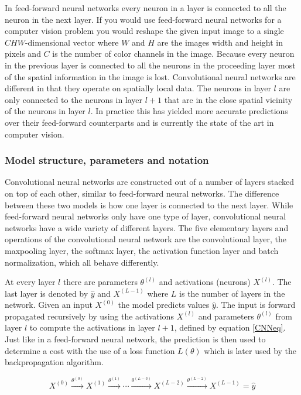 \documentclass[a4paper,11pt,twoside]{article}
\begin{document}
In feed-forward neural networks every neuron in a layer is connected to all the neuron in the next layer. If you would use feed-forward neural networks for a computer vision problem you would reshape the given input image to a single $CHW$-dimensional vector where $W$ and $H$ are the images width and height in pixels and $C$ is the number of color channels in the image. Because every neuron in the previous layer is connected to all the neurons in the proceeding layer most of the spatial information in the image is lost. Convolutional neural networks are different in that they operate on spatially local data. The neurons in layer $l$ are only connected to the neurons in layer $l+1$ that are in the close spatial vicinity of the neurons in layer $l$. In practice this has yielded more accurate predictions over their feed-forward counterparts and is currently the state of the art in computer vision.

\subsubsection{Model structure, parameters and notation}
Convolutional neural networks are constructed out of a number of layers stacked on top of each other, similar to feed-forward neural networks. The difference between these two models is how one layer is connected to the next layer. While feed-forward neural networks only have one type of layer, convolutional neural networks have a wide variety of different layers. The five elementary layers and operations of the convolutional neural network are the convolutional layer, the maxpooling layer, the softmax layer, the activation function layer and batch normalization, which all behave differently. 

At every layer $l$ there are parameters $\theta^{(l)}$ and activations (neurons) $X^{(l)}$. The last layer is denoted by $\hat{y}$ and $X^{(L-1)}$ where $L$ is the number of layers in the network. Given an input $X^{(0)}$ the model predicts values $\hat{y}$. The input is forward propagated recursively by using the activations $X^{(l)}$ and parameters $\theta^{(l)}$ from layer $l$ to compute the activations in layer $l+1$, defined by equation \eqref{CNNeq}. Just like in a feed-forward neural network, the prediction is then used to determine a cost with the use of a loss function $L(\theta)$ which is later used by the backpropagation algorithm.

\begin{equation}\label{CNNeq}
X^{(0)} \xrightarrow{\theta^{(0)}} X^{(1)}  \xrightarrow{\theta^{(1)}} \cdots  \xrightarrow{\theta^{(L-3)}} X^{(L-2)}  \xrightarrow{\theta^{(L-2)}} X^{(L-1)} = \hat{y}
\end{equation}
\end{document}
